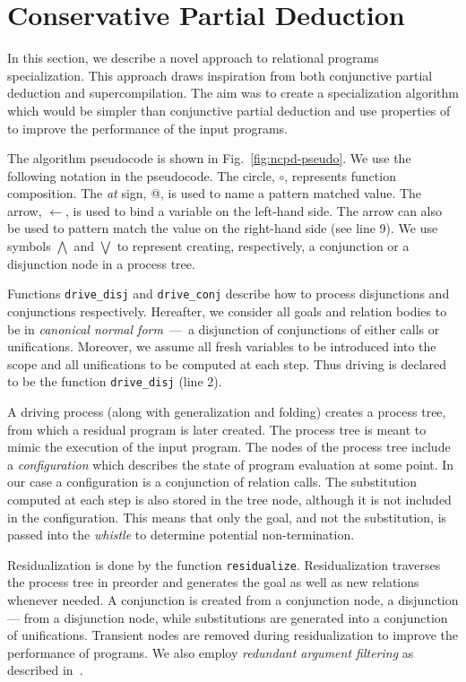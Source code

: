 \newcommand{\code}[1]{\texttt{#1}}

\section{Conservative Partial Deduction}
\label{conspd}

In this section, we describe a novel approach to relational programs specialization.
This approach draws inspiration from both conjunctive partial deduction and supercompilation.
The aim was to create a specialization algorithm which would be simpler than conjunctive partial deduction and use properties of \mk to improve the performance of the input programs.

The algorithm pseudocode is shown in Fig.~\ref{fig:ncpd-pseudo}.
We use the following notation in the pseudocode.
The circle, $\circ$, represents function composition.
The \emph{at} sign, @, is used to name a pattern matched value.
The arrow, $\leftarrow$, is used to bind a variable on the left-hand side.
The arrow can also be used to pattern match the value on the right-hand side (see line 9).
We use symbols $\bigwedge$ and $\bigvee$ to represent creating, respectively, a conjunction or a disjunction node in a process tree.

Functions \code{drive\_disj} and \code{drive\_conj} describe how to process disjunctions and conjunctions respectively.
Hereafter, we consider all goals and relation bodies to be in \emph{canonical normal form}~---~a disjunction of conjunctions of either calls or unifications.
Moreover, we assume all fresh variables to be introduced into the scope and all unifications to be computed at each step.
Thus driving is declared to be the function \code{drive\_disj} (line 2).

A driving process (along with generalization and folding) creates a process tree, from which a residual program is later created.
The process tree is meant to mimic the execution of the input program.
The nodes of the process tree include a \emph{configuration} which describes the state of program evaluation at some point.
In our case a configuration is a conjunction of relation calls.
The substitution computed at each step is also stored in the tree node, although it is not included in the configuration.
This means that only the goal, and not the substitution, is passed into the \emph{whistle} to determine potential non-termination.

Residualization is done by the function \code{residualize}.
Residualization traverses the process tree in preorder and generates the \mk goal as well as new relations whenever needed.
A conjunction is created from a conjunction node, a disjunction --- from a disjunction node, while substitutions are generated into a conjunction of unifications.
Transient nodes are removed during residualization to improve the performance of programs.
We also employ \emph{redundant argument filtering} as described in~\cite{leuschel1996redundant}.

